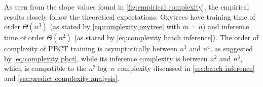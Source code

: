 \documentclass[sn-mathphys-num]{sn-jnl}%
\theoremstyle{thmstyleone}%
\theoremstyle{thmstyletwo}%
\theoremstyle{thmstylethree}%
\begin{document}
As seen from the slope values found in \autoref{fig:empirical complexity}, the empirical results closely follow the theoretical expectations: Oxytrees have training time of order $\Theta(n^3)$ (as stated by \autoref{eq:complexity oxytree} with $m=n$) and inference time of order $\Theta(n^2)$ (as stated by \autoref{eq:complexity batch inference}). The order of complexity of PBCT training is asymptotically between $n^3$ and $n^4$, as suggested by \autoref{eq:complexity pbct}, while its inference complexity is between $n^2$ and $n^3$, which is compatible to the $n^2\log \; n$ complexity discussed in \autoref{sec:batch inference} and \autoref{sec:predict complexity analysis}.


%     
%     
%     
\end{document}
